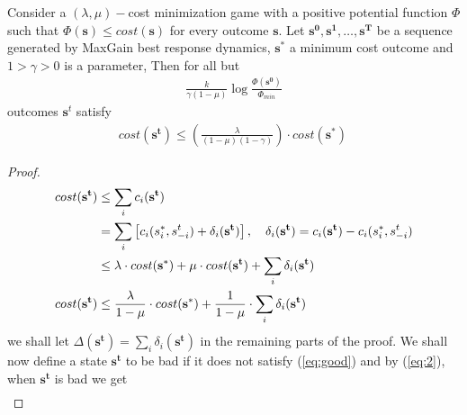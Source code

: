\begin{thm}
Consider a $(\lambda,\mu)-$cost minimization game with a positive potential function $\Phi$ such that $\Phi(\mathbf{s}) \leq cost(\mathbf{s})$ for every outcome $\mathbf{s}$. Let $\mathbf{s^0},\mathbf{s^1},\ldots,\mathbf{s^T}$ be a sequence generated by MaxGain best response dynamics, $\mathbf{s^\ast}$ a minimum cost outcome and $1>\gamma>0$ is a parameter, Then for all but 
\begin{align}
\frac{k}{\gamma(1-\mu)}\log\frac{\Phi(\mathbf{s^0})}{\Phi_{min}}\label{eq:outcomes}
\end{align}
outcomes $\mathbf{s}^t$ satisfy
\begin{align}
cost(\mathbf{s^t})\leq \left(\frac{\lambda}{(1-\mu)(1-\gamma)}\right)\cdot cost(\mathbf{s^\ast})\, \label{eq:good}
\end{align}
\begin{proof}
\begin{align}
cost(\mathbf{s^t})&\leq \sum_i c_i(\mathbf{s^t})\notag\\
&=\sum_i\left[c_i(s_i^\ast,s_{-i}^t)+\delta_i(\mathbf{s^t})\right],\quad \delta_i(\mathbf{s^t})=c_i(\mathbf{s^t})-c_i(s_i^\ast,s^t_{-i})\notag\\
&\leq \lambda \cdot cost(\mathbf{s^\ast})+\mu \cdot cost(\mathbf{s^t})+\sum_i\delta_i(\mathbf{s^t})\notag\\
cost(\mathbf{s^t})&\leq \frac{\lambda}{1-\mu}\cdot cost(\mathbf{s^\ast}) + \frac{1}{1-\mu}\cdot \sum_i\delta_i(\mathbf{s^t}) \label{eq:2}
\end{align}
we shall let $\Delta(\mathbf{s^t})=\sum_i\delta_i(\mathbf{s^t})$ in the remaining parts of the proof. We shall now define a state $\mathbf{s^t}$ to be bad if it does not satisfy (\ref{eq:good}) and 
by (\ref{eq:2}), when $\mathbf{s^t}$ is bad we get
\begin{align*}

\end{align*}
\end{proof}
\end{thm}
